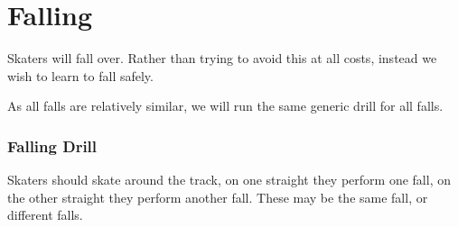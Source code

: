 \chapter{Falling}
\label{ch:falling}

Skaters will fall over.
Rather than trying to avoid this at all costs, instead we wish to learn to fall safely.


As all falls are relatively similar, we will run the same generic drill for all falls. 


\subsection*{Falling Drill}
\label{drill:falling}

Skaters should skate around the track, on one straight they perform one fall, on the other straight they perform another fall. 
These may be the same fall, or different falls.

